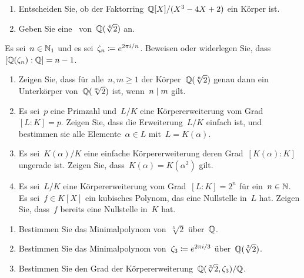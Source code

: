 \documentclass{scrartcl}
\begin{document}
\begin{exercise}[subtitle = {Erstklausur~19/20}]
  \begin{enumerate}
    \item
      Entscheiden Sie, ob der Faktorring~$\mathbb{Q}[X] / (X^3 - 4X + 2)$ ein Körper ist.
    \item
      Geben Sie eine~\Basis{$\Rational$} von~$\mathbb{Q}(\sqrt[4]{2})$ an.
  \end{enumerate}
\end{exercise}

\begin{exercise}[subtitle = {Erstklausur~18/19, Zweitklausur~18/19}]
  Es sei~$n \in \mathbb{N}_1$ und es sei~$\zeta_n \coloneqq e^{2 \pi i / n}$.
  Beweisen oder widerlegen Sie, dass~$[\mathbb{Q}(\zeta_n) : \mathbb{Q}] = n-1$.
\end{exercise}

\begin{exercise}
  \begin{enumerate}
    \item
      Zeigen Sie, dass für alle~$n, m \geq 1$ der Körper~$\mathbb{Q}(\sqrt[n]{2})$ genau dann ein Unterkörper von~$\mathbb{Q}(\sqrt[m]{2})$ ist, wenn~$n \mid m$ gilt.
    \item
      Es sei~$p$ eine Primzahl und~$L/K$ eine Körpererweiterung vom Grad~$[L : K] = p$.
      Zeigen Sie, dass die Erweiterung~$L/K$ einfach ist, und bestimmen sie alle Elemente~$\alpha \in L$ mit~$L = K(\alpha)$.
    \item
      Es sei~$K(\alpha)/K$ eine einfache Körpererweiterung deren Grad~$[K(\alpha) : K]$ ungerade ist.
      Zeigen Sie, dass~$K(\alpha) = K(\alpha^2)$ gilt.
    \item
      Es sei~$L/K$ eine Körpererweiterung vom Grad~$[L : K] = 2^n$ für ein~$n \in \mathbb{N}$.
      Es sei~$f \in K[X]$ ein kubisches Polynom, das eine Nullstelle in~$L$ hat.
      Zeigen Sie, dass~$f$ bereits eine Nullstelle in~$K$ hat.
  \end{enumerate}
\end{exercise}

\begin{exercise}
  \begin{enumerate}
    \item
      Bestimmen Sie das Minimalpolynom von~$\sqrt[3]{2}$ über~$\Rational$.
    \item
      Bestimmen Sie das Minimalpolynom von~$\zeta_3 \coloneqq e^{2 \pi i / 3}$ über~$\mathbb{Q}(\sqrt[3]{2})$.
    \item
      Bestimmen Sie den Grad der Körpererweiterung~$\mathbb{Q}(\sqrt[3]{2}, \zeta_3) / \mathbb{Q}$.
  \end{enumerate}
\end{exercise}
\end{document}
